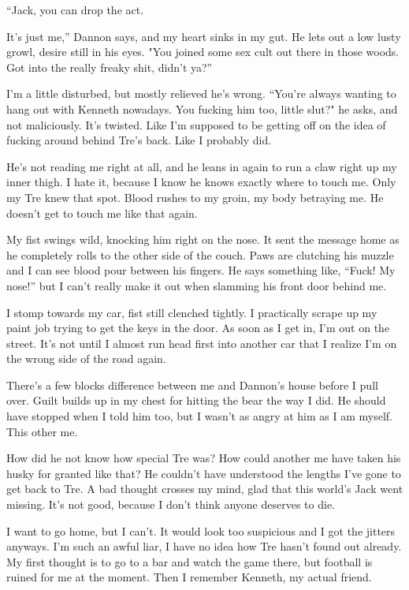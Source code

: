 ``Jack, you can drop the act.

It's just me,'' Dannon says, and my heart sinks in my gut. He lets out a
low lusty growl, desire still in his eyes. "You joined some sex cult out
there in those woods. Got into the really freaky shit, didn't ya?''

I'm a little disturbed, but mostly relieved he's wrong. ``You're always
wanting to hang out with Kenneth nowadays. You fucking him too, little
slut?" he asks, and not maliciously. It's twisted. Like I'm supposed to
be getting off on the idea of fucking around behind Tre's back. Like I
probably did.

He's not reading me right at all, and he leans in again to run a claw
right up my inner thigh. I hate it, because I know he knows exactly
where to touch me. Only my Tre knew that spot. Blood rushes to my groin,
my body betraying me. He doesn't get to touch me like that again.

My fist swings wild, knocking him right on the nose. It sent the message
home as he completely rolls to the other side of the couch. Paws are
clutching his muzzle and I can see blood pour between his fingers. He
says something like, ``Fuck! My nose!'' but I can't really make it out
when slamming his front door behind me.

I stomp towards my car, fist still clenched tightly. I practically
scrape up my paint job trying to get the keys in the door. As soon as I
get in, I'm out on the street. It's not until I almost run head first
into another car that I realize I'm on the wrong side of the road again.

There's a few blocks difference between me and Dannon's house before I
pull over. Guilt builds up in my chest for hitting the bear the way I
did. He should have stopped when I told him too, but I wasn't as angry
at him as I am myself. This other me.

How did he not know how special Tre was? How could another me have taken
his husky for granted like that? He couldn't have understood the lengths
I've gone to get back to Tre. A bad thought crosses my mind, glad that
this world's Jack went missing. It's not good, because I don't think
anyone deserves to die.

I want to go home, but I can't. It would look too suspicious and I got
the jitters anyways. I'm such an awful liar, I have no idea how Tre
hasn't found out already. My first thought is to go to a bar and watch
the game there, but football is ruined for me at the moment. Then I
remember Kenneth, my actual friend.

